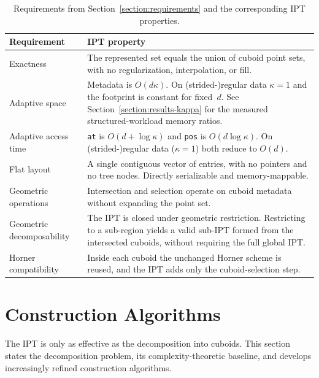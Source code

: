 \documentclass[manuscript,screen,review]{acmart}
\theoremstyle{definition}
\theoremstyle{plain}
\begin{document}
\begin{table}[ht]
\centering
\caption{Requirements from Section~\ref{section:requirements} and the corresponding IPT properties.}
\label{table:requirements-summary}
\begin{tabular}{lp{}}
\toprule
Requirement & IPT property \\
\midrule
Exactness
  & The represented set equals the union of cuboid point
    sets, with no regularization, interpolation, or fill. \\
Adaptive space
  & Metadata is $O(d\kappa)$. On (strided-)regular data $\kappa = 1$
    and the footprint is constant for fixed~$d$.
    See Section~\ref{section:results-kappa} for the measured
    structured-workload memory ratios. \\
Adaptive access time
  & \texttt{at} is $O(d+\log\kappa)$ and \texttt{pos} is
    $O(d\log\kappa)$.
    On (strided-)regular data ($\kappa = 1$) both reduce to $O(d)$. \\
Flat layout
  & A single contiguous vector of entries, with no pointers and no
    tree nodes. Directly serializable and memory-mappable. \\
Geometric operations
  & Intersection and selection operate on cuboid metadata
    without expanding the point set. \\
Geometric decomposability
  & The IPT is closed under geometric restriction. Restricting
    to a sub-region yields a valid sub-IPT formed from the
    intersected cuboids, without requiring the full global IPT. \\
Horner compatibility
  & Inside each cuboid the unchanged Horner scheme
    is reused, and the IPT adds only the cuboid-selection step. \\
\bottomrule
\end{tabular}
\end{table}

\section{Construction Algorithms}
\label{section:construction}

The IPT is only as effective as the decomposition into cuboids. This section states the decomposition problem, its complexity-theoretic baseline, and develops increasingly refined construction algorithms.
\end{document}
